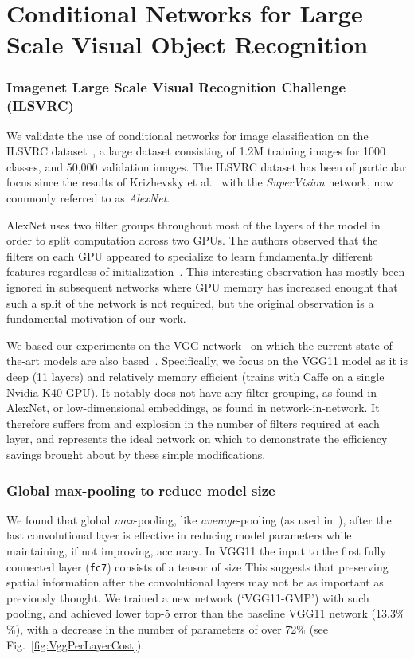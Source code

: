 \documentclass[thesis]{subfiles}
\begin{document}
\chapter{Conditional Networks for Large Scale Visual Object Recognition}
\label{firstyear}

\subsection{Imagenet Large Scale Visual Recognition Challenge (ILSVRC)}
We validate the use of conditional networks for image classification on the ILSVRC dataset~\cite{ILSVRC2015}, a large dataset consisting of 1.2M training images for 1000 classes, and 50,000 validation images. The ILSVRC dataset has been of particular focus since the results of Krizhevsky et al.~\cite{Krizhevsky2012imanet} with the \emph{SuperVision} network, now commonly referred to as \emph{AlexNet}.

AlexNet uses two filter groups throughout most of the layers of the model in order to split computation across two GPUs. The authors observed that the filters on each GPU appeared to specialize to learn fundamentally different features regardless of initialization~\cite{Krizhevsky2012imanet}. This interesting observation has mostly been ignored in subsequent networks where GPU memory has increased enought that such a split of the network is not required, but the original observation is a fundamental motivation of our work.

We based our experiments on the VGG network~\cite{Simonyan2014verydeep} on which the current state-of-the-art models are also based~\cite{He2015delving}. Specifically, we focus on the VGG11 model as it is deep (11 layers) and relatively memory efficient (trains with Caffe on a single Nvidia K40 GPU). It notably does not have any filter grouping, as found in AlexNet, or low-dimensional embeddings, as found in network-in-network. It therefore suffers from and explosion in the number of filters required at each layer, and represents the ideal network on which to demonstrate the efficiency savings brought about by these simple modifications.

\subsection{Global max-pooling to reduce model size}
We found that global {\em max}-pooling, like 
{\em average}-pooling (as used in~\cite{Lin2013NiN,Szegedy2014going}), after the last convolutional layer is effective in reducing model parameters while maintaining, if not improving, accuracy. In VGG11 the input to the first fully connected layer (\ie \texttt{fc7}) consists of a tensor of size 
This suggests that preserving spatial information after the convolutional layers may not be as important as previously thought. 
We trained a new network (`VGG11-GMP') with such pooling, and achieved lower top-5 error than the baseline VGG11 
network (13.3\% \%), with a decrease in the number of parameters of over 72\% (see Fig.~\ref{fig:VggPerLayerCost}).
\end{document}
